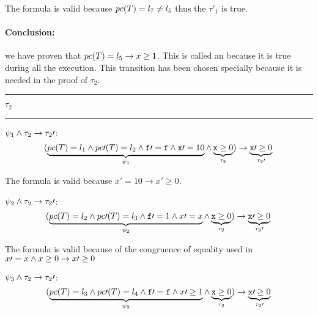 	The formula is valid because $pc(T) = l_7 \neq l_5$ thus the $\tau\prime _1$ is true.


\paragraph{Conclusion:} we have proven that $pc(T) = l_5 \to x \geq 1$. 
%
This is called an  because it is true during all the execution. 
%
This transition has been chosen specially because it is needed in the proof of $\tau_2$.

\begin{center}\rule{4cm}{0.4pt}  $\tau_2$  \rule{4cm}{0.4pt}\end{center}

	\; $\psi_1 \wedge \tau_2 \to \tau_2\prime $:	
	\begin{equation*}
		(
			\underbrace{pc(T) = l_1 \wedge pc\prime (T) = l_2 \wedge \mathtt{f\prime =f} \wedge \mathtt{x}\prime  = 10}_{\psi_1} \wedge \underbrace{\mathtt{x} \geq 0}_{\tau_2}
		) 
				\to  \underbrace{\mathtt{x}\prime  \geq 0}_{\tau_2\prime }\\\\
	\end{equation*}


	The formula is valid because $x\prime =10 \to x\prime \geq 0$.

	\; $\psi_2 \wedge \tau_2 \to \tau_2\prime $:	
	\begin{equation*}
		(
			\underbrace{pc(T) = l_2 \wedge pc\prime (T) = l_3 \wedge \mathtt{f}\prime  = 1 \wedge x\prime =x}_{\psi_2} \wedge \underbrace{\mathtt{x} \geq 0}_{\tau_2}
		) 
			\to \underbrace{\mathtt{x}\prime  \geq 0}_{\tau_2\prime }\\\\
	\end{equation*}



	The formula is valid because of the congruence of equality used in  $x\prime =x \wedge x\geq 0 \to x\prime \geq 0$ 

	\; $\psi_3 \wedge \tau_2 \to \tau_2\prime $:
	\begin{equation*}
		(
			\underbrace{pc(T) = l_3 \wedge pc\prime (T) = l_4 \wedge \mathtt{f\prime =f} \wedge x\prime \geq 1}_{\psi_3} \wedge \underbrace{\mathtt{x} \geq 0}_{\tau_2}
		) 
			\to \underbrace{\mathtt{x}\prime  \geq 0}_{\tau_2\prime }\\\\
	\end{equation*}


